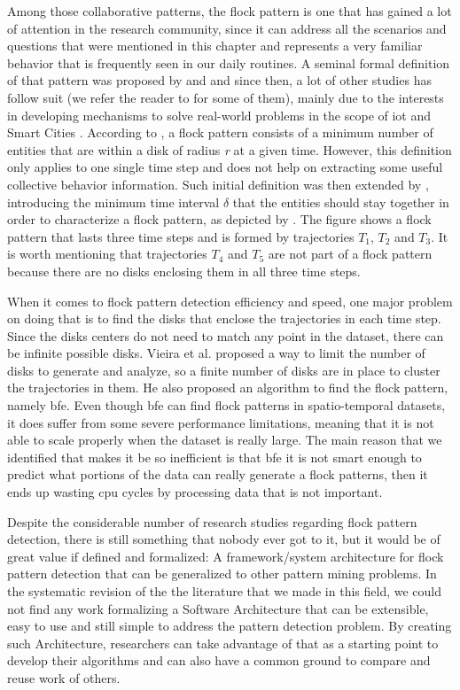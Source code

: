 Among those collaborative patterns, the flock pattern is one that has gained a lot of attention in the research
community, since it can address all the scenarios and questions that were mentioned in this chapter and represents a
very familiar behavior that is frequently seen in our daily routines. A seminal formal definition of that pattern was
proposed by \citep{remo} and \citep{gudefficient} and since then, a lot of other studies has follow suit (we refer the
reader to  for some of them), mainly due to the interests in developing mechanisms to solve
real-world problems in the scope of \ac{iot} \citep{iot} and Smart Cities \citep{smartcities}.  According to
\citep{gudefficient}, a flock pattern consists of a minimum number of entities that are within a disk of radius
\textit{r} at a given time.  However, this definition only applies to one single time step and does not help on
extracting some useful collective behavior information. Such initial definition was then extended by
\citep{gudreportingflock}, introducing the minimum time interval $\delta$ that the entities should stay together in
order to characterize a flock pattern, as depicted by . The figure shows a flock pattern that lasts
three time steps and is formed by trajectories $T_1$, $T_2$ and $T_3$. It is worth mentioning that trajectories $T_4$
and $T_5$ are not part of a flock pattern because there are no disks enclosing them in all three time steps.

When it comes to flock pattern detection efficiency and speed, one major problem on doing that is to find the disks that
enclose the trajectories in each time step. Since the disks centers do not need to match any point in the dataset, there
can be infinite possible disks. Vieira et al. \citep{vieira} proposed a way to limit the number of disks to generate and
analyze, so a finite number of disks are in place to cluster the trajectories in them. He also proposed an algorithm to
find the flock pattern, namely \ac{bfe}. Even though \ac{bfe} can find flock patterns in spatio-temporal datasets, it
does suffer from some severe performance limitations, meaning that it is not able to scale properly when the dataset is
really large. The main reason that we identified that makes it be so inefficient is that \ac{bfe} it is not smart enough
to predict what portions of the data can really generate a flock patterns, then it ends up wasting \ac{cpu} cycles by
processing data that is not important.

Despite the considerable number of research studies regarding flock pattern detection, there is still something that
nobody ever got to it, but it would be of great value if defined and formalized: A framework/system architecture for
flock pattern detection that can be generalized to other pattern mining problems. In the systematic revision of the the
literature that we made in this field, we could not find any work formalizing a Software Architecture that can be
extensible, easy to use and still simple to address the pattern detection problem. By creating such Architecture,
researchers can take advantage of that as a starting point to develop their algorithms and can also have a common ground
to compare and reuse work of others.

